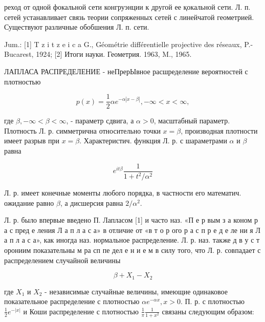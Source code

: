 \documentclass[10pt]{article}
\begin{document}
реход от одной фокальной сети конгруэнции к другой ее қокальной сети. Л. п. сетей устанавливает связь теории сопряженных сетей с линейчатой геометрией. Существуют различные обобшения Л. п. сети.



Jum.: [1] T z i t z e i c a G., Géométrie différentielle projective des réseaux, P.-Bucarest, 1924; [2] Итоги науки. Геометрия. 1963, M., 1965.



ЛАПЛАСА РАСПРЕДЕЛЕНИЕ - неПрерЫвное расшределение вероятностей с плотностью



\[

p(x)=\frac{1}{2} \alpha e^{-\alpha|x-\beta|},-\infty<x<\infty,

\]



где $\beta,-\infty<\beta<\infty$, - параметр сдвига, а $\alpha>0$, масштабный параметр. Плотность Л. р. симметрична относительно точки $x=\beta$, производная плотности имеет разрыв при $x=\beta$. Характеристич. функция Л. р. с шараметрами $\alpha$ и $\beta$ равна



\[

e^{i t \beta} \frac{1}{1+t^{2} / \alpha^{2}}

\]



Л. р. имеет конечные моменты любого порядка, в частности его математич. ожидание равно $\beta$, а дисшерсия равна $2 / \alpha^{2}$.



Л. р. было впервые введено П. Лапласом [1] и часто наз. «П е р вым з а коном р а с пред е ления Л а п л а с а» в отличие от «в т о р ого р а с п р е д е ле ни я Л а п л а с а», как иногда наз. нормальное распределение. Л. р. наз. также д в у с т орониим показательны м ра сп пе дел е н и е м в силу того, что Л. р. совпадает с распределением случайной величины



\[

\beta+X_{1}-X_{2}

\]



где $X_{1}$ и $X_{2}$ - независимые случайные величины, имеющие одинаковое показательное распределение с плотностью $\alpha e^{-\alpha x}, x>0$. П. р. с плотностью $\frac{1}{2} e^{-|x|}$ и Коши распределение с плотностью $\frac{1}{\pi} \frac{1}{1+x^{2}}$ связаны следующим образом:
\end{document}
